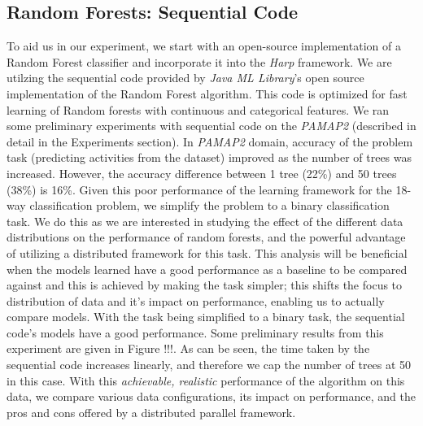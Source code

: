 \documentclass{sig-alternate-05-2015}
\begin{document}
\subsection{Random Forests: Sequential Code}
To aid us in our experiment, we start with an open-source implementation of a Random Forest classifier and incorporate it into the \textit{Harp} framework.  We are utilzing the sequential code provided by \textit{Java ML Library}'s \cite{abeel2009java} open source implementation of the Random Forest algorithm. This code is optimized for fast learning of Random forests with continuous and categorical features. We ran some preliminary experiments with \cite{abeel200java} sequential code on the \textit{PAMAP2} \cite{reiss2012introducing,reiss2012creating} (described in detail in the Experiments section). In \textit{PAMAP2} domain, accuracy of the problem task (predicting activities from the dataset) improved as the number of trees was increased. However, the accuracy difference between 1 tree (22\%) and 50 trees (38\%) is 16\%. Given this poor performance of the learning framework for the 18-way classification problem, we simplify the problem to a binary classification task. We do this as we are interested in studying the effect of the different data distributions on the performance of random forests, and the powerful advantage of utilizing a distributed framework for this task. This analysis will be beneficial when the models learned have a good performance as a baseline to be compared against and this is achieved by making the task simpler; this shifts the focus to distribution of data and it's impact on performance, enabling us to actually compare models. With the task being simplified to a binary task, the sequential code's models have a good performance. Some preliminary results from this experiment are given in Figure !!!. As can be seen, the time taken by the sequential code increases linearly, and therefore we cap the number of trees at 50 in this case. With this \textit{achievable, realistic} performance of the algorithm on this data, we compare various data configurations, its impact on performance, and the pros and cons offered by a distributed parallel framework. 
\end{document}
